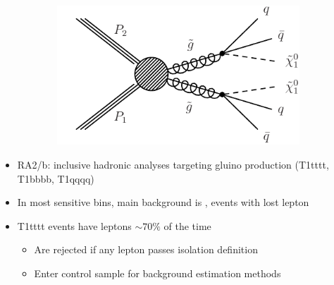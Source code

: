 \documentclass{beamer}
\begin{document}
\begin{frame}
\begin{figure}
\begin{subfigure}[b]{0.3\textwidth}
      \includegraphics[width=\textwidth]{figures/jacks_Studies/T1qqqq}
    \end{subfigure}
  \end{figure}
  \begin{itemize}
  \item RA2/b: inclusive hadronic analyses targeting gluino production (T1tttt, T1bbbb, T1qqqq)
  \item In most sensitive bins, main background is \ttbar, \wpj events with lost lepton
  \item T1tttt events have leptons $\sim 70 \%$ of the time
  \begin{itemize}
   \item Are rejected if any lepton passes isolation definition
   \item Enter control sample for background estimation methods
  \end{itemize}  
  \end{itemize}
\end{frame}
\end{document}

